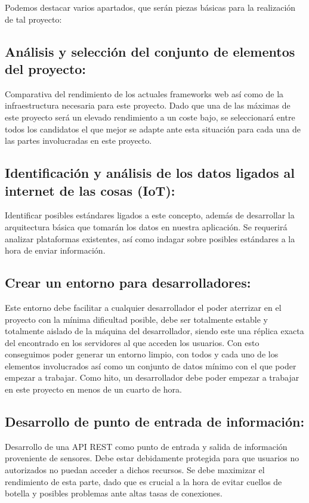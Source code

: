 Podemos destacar varios apartados, que serán piezas básicas para la realización
de tal proyecto:

\subsection{Análisis y selección del conjunto de elementos del
proyecto:} Comparativa del rendimiento de los actuales frameworks web así como de la
infraestructura necesaria para este proyecto. Dado que una de las máximas de
este proyecto será un elevado rendimiento a un coste bajo, se seleccionará entre
todos los candidatos el que mejor se adapte ante esta situación para cada una de
las partes involucradas en este proyecto.

\subsection{Identificación y análisis de los datos ligados al internet de las
  cosas (IoT):} Identificar posibles estándares ligados a este concepto, además de desarrollar la
arquitectura básica que tomarán los datos en nuestra aplicación. Se requerirá
analizar plataformas existentes, así como indagar sobre posibles estándares a la
hora de enviar información.

\subsection{Crear un entorno para desarrolladores:}
Este entorno debe facilitar a cualquier desarrollador el poder aterrizar en el
proyecto con la mínima dificultad posible, debe ser totalmente estable y
totalmente aislado de la máquina del desarrollador, siendo este una réplica exacta del encontrado en los
servidores al que acceden los usuarios. Con esto conseguimos poder generar un
entorno limpio, con todos y cada uno de los elementos involucrados así como un
conjunto de datos mínimo con el que poder empezar a trabajar. Como hito, un desarrollador
debe poder empezar a trabajar en este proyecto en menos de un cuarto de hora.

\subsection{Desarrollo de punto de entrada de información:} Desarrollo de una
\acs{API} \acs{REST} como punto de entrada y salida de información proveniente
de sensores. Debe estar debidamente protegida para que usuarios no autorizados no
puedan acceder a dichos recursos. Se debe maximizar el rendimiento de esta
parte, dado que es crucial a la hora de evitar cuellos de botella y posibles
problemas ante altas tasas de conexiones. 


